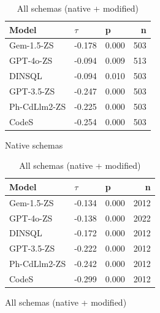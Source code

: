 \begin{table}
  \centering
  \caption{Kendall-Tau ($\tau$) Correlations between \emph{Least Identifier Proportion} and \emph{Query Precision}.}
  \begin{subfigure}{.5\linewidth}
      \centering
      \caption{Native schemas}
      \begin{tabular}{lllr}
\toprule
Model & $\tau$ & p & n \\
\midrule
Gem-1.5-ZS & -0.178 & 0.000 & 503 \\
GPT-4o-ZS & -0.094 & 0.009 & 513 \\
DINSQL & -0.094 & 0.010 & 503 \\
GPT-3.5-ZS & -0.247 & 0.000 & 503 \\
Ph-CdLlm2-ZS & -0.225 & 0.000 & 503 \\
CodeS & -0.254 & 0.000 & 503 \\
\bottomrule
\end{tabular}

      \label{table:natlow-precision-ktau-native}
  \end{subfigure}%
  \begin{subfigure}{.5\linewidth}
      \centering
      \caption{All schemas (native + modified)}
      \begin{tabular}{lllr}
\toprule
Model & $\tau$ & p & n \\
\midrule
Gem-1.5-ZS & -0.134 & 0.000 & 2012 \\
GPT-4o-ZS & -0.138 & 0.000 & 2022 \\
DINSQL & -0.172 & 0.000 & 2012 \\
GPT-3.5-ZS & -0.222 & 0.000 & 2012 \\
Ph-CdLlm2-ZS & -0.242 & 0.000 & 2012 \\
CodeS & -0.299 & 0.000 & 2012 \\
\bottomrule
\end{tabular}

      \label{table:natlow-precision-ktau-all}
  \end{subfigure}
\end{table}


